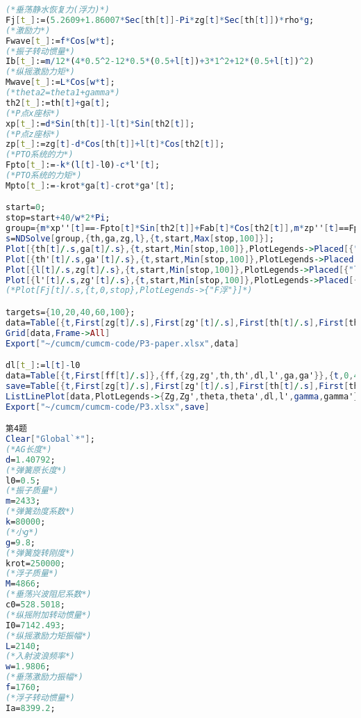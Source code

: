 \begin{lstlisting}[language=Mathematica,breaklines]
(*垂荡静水恢复力(浮力)*)
Fj[t_]:=(5.2609+1.86007*Sec[th[t]]-Pi*zg[t]*Sec[th[t]])*rho*g;
(*激励力*)
Fwave[t_]:=f*Cos[w*t];
(*振子转动惯量*)
Ib[t_]:=m/12*(4*0.5^2-12*0.5*(0.5+l[t])+3*1^2+12*(0.5+l[t])^2)
(*纵摇激励力矩*)
Mwave[t_]:=L*Cos[w*t];
(*theta2=theta1+gamma*)
th2[t_]:=th[t]+ga[t];
(*P点x座标*)
xp[t_]:=d*Sin[th[t]]-l[t]*Sin[th2[t]];
(*P点z座标*)
zp[t_]:=zg[t]-d*Cos[th[t]]+l[t]*Cos[th2[t]];
(*PTO系统的力*)
Fpto[t_]:=-k*(l[t]-l0)-c*l'[t];
(*PTO系统的力矩*)
Mpto[t_]:=-krot*ga[t]-crot*ga'[t];

start=0;
stop=start+40/w*2*Pi;
group={m*xp''[t]==-Fpto[t]*Sin[th2[t]]+Fab[t]*Cos[th2[t]],m*zp''[t]==Fpto[t]*Cos[th2[t]]-m*g+Fab[t]*Sin[th2[t]],Ib[t]*th2''[t]==Mpto[t]+Fab[t]*l[t],M*zg''[t]==Fwave[t]+Fj[t]-M*g-Fpto[t]*Cos[th2[t]]-Fab[t]*Sin[th2[t]]-m0*zg''[t]-c0*zg'[t],Ia*th''[t]==Mwave[t]-Mpto[t]+Fab[t]*d*Cos[th[t]]*Cos[th2[t]]-Fab[t]*d*Sin[th[t]]*Sin[th2[t]]-I0*th''[t]-cr0*th'[t]-Mrec*th[t],th'[0]==th[0]==ga[0]==ga'[0]==l'[0]==zg'[0]==0,l[0]==l0-m/k,zg[0]==0};
s=NDSolve[group,{th,ga,zg,l},{t,start,Max[stop,100]}];
Plot[{th[t]/.s,ga[t]/.s},{t,start,Min[stop,100]},PlotLegends->Placed[{"\[Theta]","\[Gamma]"},{1,0.5}]]
Plot[{th'[t]/.s,ga'[t]/.s},{t,start,Min[stop,100]},PlotLegends->Placed[{"\[Theta]'","\[Gamma]'"},{1,0.5}]]
Plot[{l[t]/.s,zg[t]/.s},{t,start,Min[stop,100]},PlotLegends->Placed[{"l","Zg"},{1,0.5}]]
Plot[{l'[t]/.s,zg'[t]/.s},{t,start,Min[stop,100]},PlotLegends->Placed[{"l'","Zg'"},{1,0.5}]]
(*Plot[Fj[t]/.s,{t,0,stop},PlotLegends->{"F浮"}]*)

targets={10,20,40,60,100};
data=Table[{t,First[zg[t]/.s],First[zg'[t]/.s],First[th[t]/.s],First[th'[t]/.s],First[l[t]/.s],First[l'[t]/.s],First[ga[t]/.s],First[ga'[t]/.s]},{t,targets}];
Grid[data,Frame->All]
Export["~/cumcm/cumcm-code/P3-paper.xlsx",data]

dl[t_]:=l[t]-l0
data=Table[{t,First[ff[t]/.s]},{ff,{zg,zg',th,th',dl,l',ga,ga'}},{t,0,40/w*2*Pi,0.2}];
save=Table[{t,First[zg[t]/.s],First[zg'[t]/.s],First[th[t]/.s],First[th'[t]/.s],First[dl[t]/.s],First[l'[t]/.s],First[ga[t]/.s],First[ga'[t]/.s]},{t,0,40/w,0.2}];
ListLinePlot[data,PlotLegends->{Zg,Zg',theta,theta',dl,l',gamma,gamma'}]
Export["~/cumcm/cumcm-code/P3.xlsx",save]

第4题
Clear["Global`*"];
(*AG长度*)
d=1.40792;
(*弹簧原长度*)
l0=0.5;
(*振子质量*)
m=2433;
(*弹簧劲度系数*)
k=80000;
(*小g*)
g=9.8;
(*弹簧旋转刚度*)
krot=250000;
(*浮子质量*)
M=4866;
(*垂荡兴波阻尼系数*)
c0=528.5018;
(*纵摇附加转动惯量*)
I0=7142.493;
(*纵摇激励力矩振幅*)
L=2140;
(*入射波浪频率*)
w=1.9806;
(*垂荡激励力振幅*)
f=1760;
(*浮子转动惯量*)
Ia=8399.2;


\end{lstlisting}
